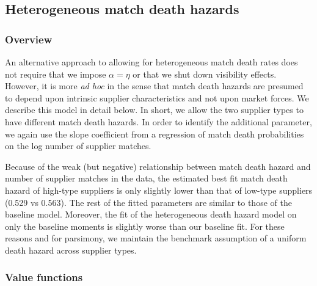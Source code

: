 \documentclass[12pt]{article} \usepackage{amsmath,amssymb,amsthm,geometry,graphicx,setspace,algorithm,algpseudocode,float}
\begin{document}
\subsection{Heterogeneous match death hazards}
\label{sec:hetero_match_death}

\subsubsection{Overview}

An alternative approach to allowing for heterogeneous match death rates does not require that we impose $\alpha=\eta$ or that we shut down visibility effects. However, it is more \textit{ad hoc} in the sense that match death hazards are presumed to depend upon intrinsic supplier characteristics and not upon market forces. We describe this model in detail below.  In short, we allow the two supplier types to have different match death hazards.  In order to identify the additional parameter, we again use the slope coefficient from a regression of match death probabilities on the log number of supplier matches. 
\par
Because of the weak (but negative) relationship between match death hazard and number of supplier matches in the data, the estimated best fit match death hazard of high-type suppliers is only slightly lower than that of low-type suppliers (0.529 vs 0.563). The rest of the fitted parameters are similar to those of the baseline model. Moreover, the fit of the heterogeneous death hazard model on only the baseline moments is slightly worse than our baseline fit.  For these reasons and for parsimony, we maintain the benchmark assumption of a uniform death hazard across supplier types.

\subsubsection{Value functions}
\end{document}
